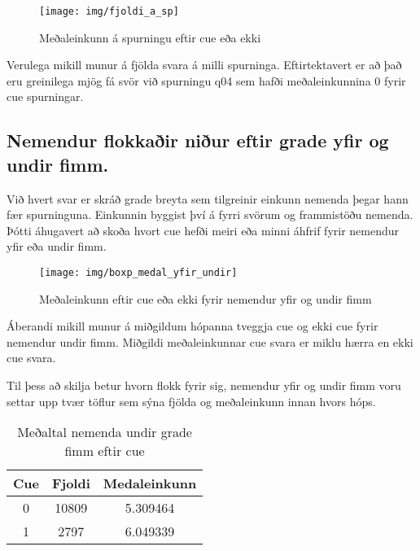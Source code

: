 \documentclass[
  10pt,
]{article}
\begin{document}
\begin{figure}[H]

{\centering \texttt{[image: img/fjoldi\_a\_sp]} 

}

\caption{Meðaleinkunn á spurningu eftir cue eða ekki}\label{fig:mynd3}
\end{figure}

Verulega mikill munur á fjölda svara á milli spurninga. Eftirtektavert er að það eru greinilega mjög fá svör við spurningu q04 sem hafði meðaleinkunnina 0 fyrir cue spurningar.

\newpage

\hypertarget{nemendur-flokkauxf0ir-niuxf0ur-eftir-grade-yfir-og-undir-fimm.}{%
\subsection{Nemendur flokkaðir niður eftir grade yfir og undir fimm.}\label{nemendur-flokkauxf0ir-niuxf0ur-eftir-grade-yfir-og-undir-fimm.}}

Við hvert svar er skráð grade breyta sem tilgreinir einkunn nemenda þegar hann fær spurninguna. Einkunnin byggist því á fyrri svörum og frammistöðu nemenda. Þótti áhugavert að skoða hvort cue hefði meiri eða minni áhfrif fyrir nemendur yfir eða undir fimm.

\begin{figure}[H]

{\centering \texttt{[image: img/boxp\_medal\_yfir\_undir]} 

}

\caption{Meðaleinkunn eftir cue eða ekki fyrir nemendur yfir og undir fimm}\label{fig:mynd11}
\end{figure}

Áberandi mikill munur á miðgildum hópanna tveggja cue og ekki cue fyrir nemendur undir fimm. Miðgildi meðaleinkunnar cue svara er miklu hærra en ekki cue svara.

Til þess að skilja betur hvorn flokk fyrir sig, nemendur yfir og undir fimm voru settar upp tvær töflur sem sýna fjölda og meðaleinkunn innan hvors hóps.

\newpage

\begin{table}[!h]

\caption{\label{tab:unnamed-chunk-7}\label{tab:str1} Meðaltal nemenda undir grade fimm eftir cue}
\centering
\begin{tabular}[t]{ccc}
\toprule
\textbf{Cue} & \textbf{Fjoldi} & \textbf{Medaleinkunn}\\
\midrule
0 & 10809 & 5.309464\\
1 & 2797 & 6.049339\\
\bottomrule
\end{tabular}
\end{table}
\end{document}
